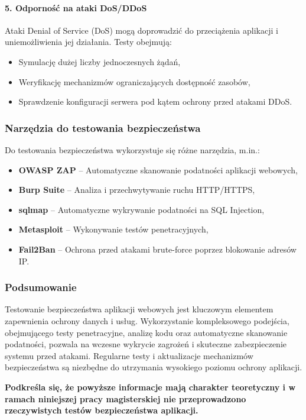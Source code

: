 \paragraph{5. Odporność na ataki DoS/DDoS}
Ataki Denial of Service (DoS) mogą doprowadzić do przeciążenia aplikacji i uniemożliwienia jej działania. Testy obejmują:
\begin{itemize}
    \item Symulację dużej liczby jednoczesnych żądań,
    \item Weryfikację mechanizmów ograniczających dostępność zasobów,
    \item Sprawdzenie konfiguracji serwera pod kątem ochrony przed atakami DDoS.
\end{itemize}

\subsubsection{Narzędzia do testowania bezpieczeństwa}
Do testowania bezpieczeństwa wykorzystuje się różne narzędzia, m.in.:
\begin{itemize}
    \item \textbf{OWASP ZAP} – Automatyczne skanowanie podatności aplikacji webowych,
    \item \textbf{Burp Suite} – Analiza i przechwytywanie ruchu HTTP/HTTPS,
    \item \textbf{sqlmap} – Automatyczne wykrywanie podatności na SQL Injection,
    \item \textbf{Metasploit} – Wykonywanie testów penetracyjnych,
    \item \textbf{Fail2Ban} – Ochrona przed atakami brute-force poprzez blokowanie adresów IP.
\end{itemize}

\subsubsection{Podsumowanie}
Testowanie bezpieczeństwa aplikacji webowych jest kluczowym elementem zapewnienia ochrony danych i usług. Wykorzystanie kompleksowego podejścia, obejmującego testy penetracyjne, analizę kodu oraz automatyczne skanowanie podatności, pozwala na wczesne wykrycie zagrożeń i skuteczne zabezpieczenie systemu przed atakami. Regularne testy i aktualizacje mechanizmów bezpieczeństwa są niezbędne do utrzymania wysokiego poziomu ochrony aplikacji.

\textbf{Podkreśla się, że powyższe informacje mają charakter teoretyczny i w ramach niniejszej pracy magisterskiej nie przeprowadzono rzeczywistych testów bezpieczeństwa aplikacji.}